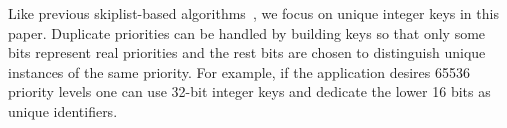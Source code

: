 \documentclass[10pt,journal,letter,compsoc]{IEEEtran}
\begin{document}
Like previous skiplist-based algorithms~\cite{fraser2007concurrent,sundell2005fast, linden2013skiplist}, we focus on unique integer keys in this paper. 
Duplicate priorities can be handled by building keys so that only some bits represent real priorities and the rest bits are chosen to distinguish unique instances of the same priority.
For example, if the application desires 65536 priority levels one can use 32-bit integer keys and dedicate the lower 16 bits as unique identifiers.
\end{document}
